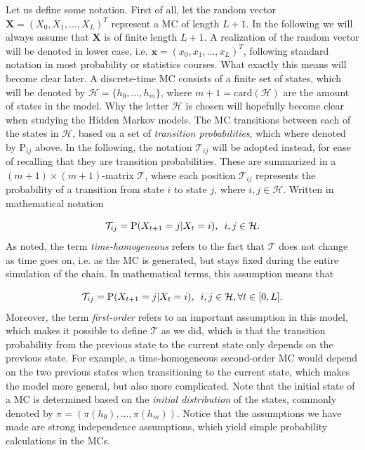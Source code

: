 \documentclass{article}\usepackage[]{graphicx}\usepackage[]{color}
\begin{document}
Let us define some notation. First of all, let the random vector $\mathbf{X} = (X_0, X_1, \ldots, X_L)^T$ represent a MC of length $L+1$. In the following we will always assume that $\mathbf{X}$ is of finite length $L+1$. A realization of the random vector will be denoted in lower case, i.e. $\mathbf{x} = (x_0, x_1, \ldots, x_L)^T$, following standard notation in most probability or statistics courses. What exactly this means will become clear later. A discrete-time MC consists of a finite set of states, which will be denoted by $\mathcal{H} = \{h_0, \ldots, h_m\}$, where $m+1 = \text{card}(\mathcal{H})$ are the amount of states in the model. Why the letter $\mathcal{H}$ is chosen will hopefully become clear when studying the Hidden Markov models. The MC transitions between each of the states in $\mathcal{H}$, based on a set of \textit{transition probabilities}, which where denoted by $\text{P}_{ij}$ above. In the following, the notation $\mathcal{T}_{ij}$ will be adopted instead, for ease of recalling that they are transition probabilities. These are summarized in a $(m+1) \times (m+1)$-matrix $\mathcal{T}$, where each position $\mathcal{T}_{ij}$ represents the probability of a transition from state $i$ to state $j$, where $i, j \in \mathcal{H}$. Written in mathematical notation

\begin{equation*}
        \mathcal{T}_{ij} = \text{P}(X_{t+1} = j|X_{t} = i), \hspace{0.5em} i,j \in \mathcal{H}. 
\end{equation*}
As noted, the term \textit{time-homogeneous} refers to the fact that $\mathcal{T}$ does not change as time goes on, i.e. as the MC is generated, but stays fixed during the entire simulation of the chain. In mathematical terms, this assumption means that

\begin{equation*}
    \mathcal{T}_{ij} = \text{P}(X_{t+1} = j|X_{t} = i), \hspace{0.5em} i,j \in \mathcal{H}, \forall t \in [0,L].
\end{equation*}
Moreover, the term \textit{first-order} refers to an important assumption in this model, which makes it possible to define $\mathcal{T}$ as we did, which is that the transition probability from the previous state to the current state only depends on the previous state. For example, a time-homogeneous second-order MC would depend on the two previous states when transitioning to the current state, which makes the model more general, but also more complicated. Note that the initial state of a MC is determined based on the \textit{initial distribution} of the states, commonly denoted by $\pi = (\pi(h_0), \ldots, \pi(h_m))$. Notice that the assumptions we have made are strong independence assumptions, which yield simple probability calculations in the MCs.
\end{document}
